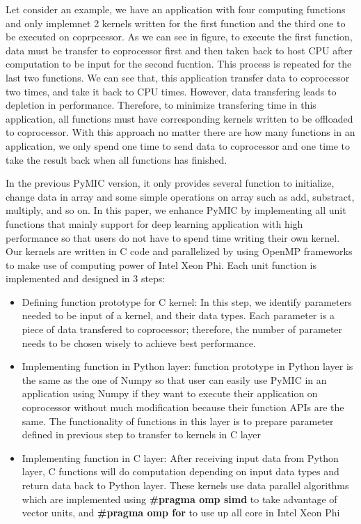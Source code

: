 Let consider an example, we have an application with four computing functions and only implemnet 2 kernels written for the first function and the third one to be executed on coprpcessor. As we can see in figure, to execute the first function, data must be transfer to coprocessor first and then taken back to host CPU after computation to be input for the second fucntion. This process is repeated for the last two functions. We can see that, this application transfer data to coprocessor two times, and take it back to CPU times. However, data transfering leads to depletion in performance. Therefore, to minimize transfering time in this application, all functions must have corresponding kernels written to be offloaded to coprocessor. With this approach no matter there are how many functions in an application, we only spend one time to send data to coprocessor and one time to take the result back when all functions has finished. 

In the previous PyMIC version, it only provides several function to initialize, change data in array and some simple operations on array such as add, substract, multiply, and so on. In this paper, we enhance PyMIC by implementing all unit functions that mainly support for deep learning application with high performance  so that users do not have to spend time writing their own kernel. Our kernels are written in C code and parallelized by using OpenMP frameworks to make use of computing power of Intel Xeon Phi. Each unit function is implemented and designed in 3 steps:

\begin{itemize}
\item Defining function prototype for C kernel: In this step, we identify parameters needed to be input of a kernel, and their data types. Each parameter is a piece of data transfered to coprocessor; therefore, the number of parameter needs to be chosen wisely to achieve best performance.

\item Implementing function in Python layer: function prototype in Python layer is the same as the one of Numpy so that user can easily use PyMIC in an application using Numpy if they want to execute their application on coprocessor without much modification because their function APIs are the same. The functionality of functions in this layer is to prepare parameter defined in previous step to transfer to kernels in C layer  		
			
\item Implementing function in C layer: After receiving input data from Python layer, C functions will do computation depending on input data types and return data back to Python layer. These kernels use data parallel algorithms which are implemented using \textbf{\#pragma omp simd} to take advantage of vector units, and \textbf{\#pragma omp for} to use up all core in Intel Xeon Phi
\end{itemize}
